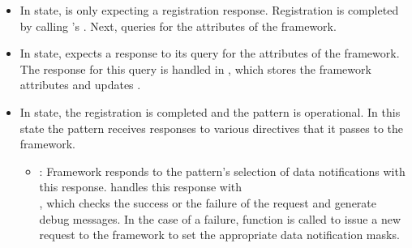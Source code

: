 
\begin{itemize}
\item In  state,  
is only expecting a registration response. 
Registration is completed by calling  's . Next,  queries for the attributes of the framework. 

\item In  state,  expects a response to its query for the attributes of the framework. The response for this query is handled in , which stores the framework attributes and updates .

\item In  state, the registration is completed and the pattern is operational. 
In this state the pattern receives responses to various directives that it passes to the framework. 

	\begin{itemize}
	\item {}: 
	Framework responds to the pattern's selection of data notifications with this response. 
	 handles this response with  \\ , which checks the success or the failure of the request and generate debug messages. 
	In the case of a failure,  function is called to issue a new request to the framework to set the appropriate data notification masks.
	

\end{itemize}
\end{itemize}
